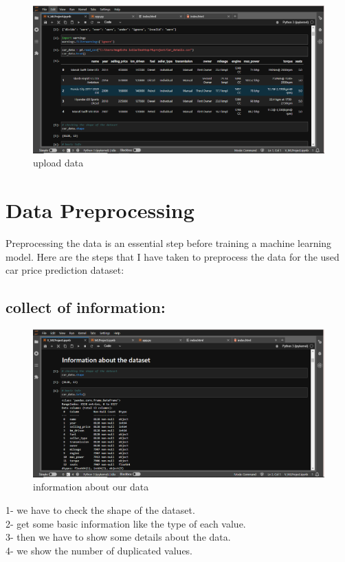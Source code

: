 \documentclass{article}
\begin{document}
\begin{figure}[h]
    \centering
    \includegraphics[width=1\textwidth]{data-f.png}
    \caption{upload data}
    \label{fig:my_label}
\end{figure}

\section{Data Preprocessing}
Preprocessing the data is an essential step before training a machine learning model. Here are the steps that I have taken to preprocess the data for the used car price prediction dataset:
\subsection{collect of information:}

\begin{flushleft}

\begin{figure}[h]
    \centering
    \includegraphics[width=1\textwidth]{infoData.png}
    \caption{information about our data}
    \label{fig:my_label}
\end{figure}

1- we have to check the shape of the dataset.\\
2- get some basic information like the type of each value.\\
3- then we have to show some details about the data.\\
4- we show the number of duplicated values.
\end{flushleft}
\end{document}
